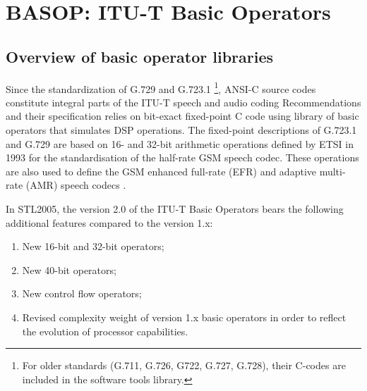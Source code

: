 \chapter{BASOP: ITU-T Basic Operators}

\def\newop20{\begin{math} \rightarrow \textsc{New in v2.0} \end{math}}

\section{Overview of basic operator libraries}

Since the standardization of G.729 and G.723.1
\footnote{For older standards (G.711, G.726, G722, G.727, G.728), their C-codes are included in the software tools library.},
ANSI-C source codes constitute integral parts of the ITU-T speech and audio coding Recommendations and their specification relies on bit-exact fixed-point C code using library of basic operators that simulates DSP operations.
The fixed-point descriptions of G.723.1 and G.729 are based on 16- and 32-bit arithmetic operations defined by ETSI in 1993 for the standardisation of the half-rate GSM speech codec.
These operations are also used to define the GSM enhanced full-rate (EFR) and adaptive multi-rate (AMR) speech codecs \cite{G.191}.

In STL2005, the version 2.0 of the ITU-T Basic Operators bears the following additional features compared to the version 1.x:
\begin{enumerate}
    \item New 16-bit and 32-bit operators;
    \item New 40-bit operators;
    \item New control flow operators;
    \item Revised complexity weight of version 1.x basic operators in order to reflect the evolution of processor capabilities.
\end{enumerate}

